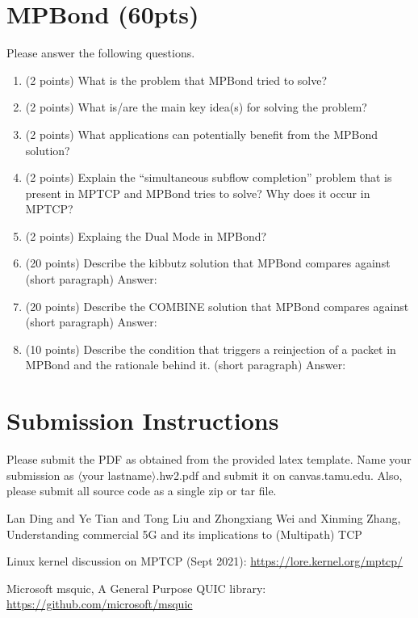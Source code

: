 \documentclass[11pt]{article}
\begin{document}
\section{MPBond (60pts)}

Please answer the following questions.
\begin{enumerate}
    \item (2 points) What is the problem that MPBond tried to solve? 
    \item (2 points) What is/are the main key idea(s) for solving the problem? 
    \item (2 points) What applications can potentially benefit from the MPBond solution? 
    \item (2 points) Explain the ``simultaneous subflow completion'' problem that is present in MPTCP and MPBond tries to solve? Why does it occur in MPTCP? 
    \item (2 points) Explaing the Dual Mode in MPBond? 
    \item (20 points) Describe the kibbutz solution that MPBond compares against (short paragraph)
    Answer:  
    \item (20 points) Describe the COMBINE solution that MPBond compares against (short paragraph)
    Answer:  
    \item (10 points) Describe the condition that triggers a reinjection of a packet in MPBond and the rationale behind it. (short paragraph)
    Answer:  
\end{enumerate}

\section{Submission Instructions}
Please submit the PDF as obtained from the provided latex template. Name your submission as $\langle$your lastname$\rangle$.hw2.pdf and submit it on canvas.tamu.edu. Also, please submit all source code as a single zip or tar file.

\begin{thebibliography}{9}
Lan Ding and Ye Tian and Tong Liu and Zhongxiang Wei and Xinming Zhang, Understanding commercial 5G and its implications to (Multipath) TCP 

Linux kernel discussion on MPTCP (Sept 2021): \url{https://lore.kernel.org/mptcp/}

Microsoft msquic, A General Purpose QUIC library: \url{https://github.com/microsoft/msquic}

\end{thebibliography}
\end{document}
